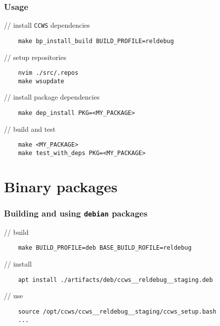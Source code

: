 \documentclass[hyperref={colorlinks=false, breaklinks=true},11pt]{beamer}
\begin{document}
\begin{frame}[fragile]
    \frametitle{Usage}
\begin{block}{// install \texttt{CCWS} dependencies}
\begin{verbatim}
    make bp_install_build BUILD_PROFILE=reldebug
\end{verbatim}
\end{block}

\begin{block}{// setup repositories}
\begin{verbatim}
    nvim ./src/.repos
    make wsupdate
\end{verbatim}
\end{block}

\begin{block}{// install package dependencies}
\begin{verbatim}
    make dep_install PKG=<MY_PACKAGE>
\end{verbatim}
\end{block}

\begin{block}{// build and test}
\begin{verbatim}
    make <MY_PACKAGE>
    make test_with_deps PKG=<MY_PACKAGE>
\end{verbatim}
\end{block}
\end{frame}


\section{Binary packages}

\begin{frame}[fragile]
    \frametitle{Building and using \texttt{debian} packages}
\begin{block}{// build}
\begin{verbatim}
    make BUILD_PROFILE=deb BASE_BUILD_ROFILE=reldebug
\end{verbatim}
\end{block}

\begin{block}{// install}
\begin{verbatim}
    apt install ./artifacts/deb/ccws__reldebug__staging.deb
\end{verbatim}
\end{block}

\begin{block}{// use}
\begin{verbatim}
    source /opt/ccws/ccws__reldebug__staging/ccws_setup.bash
    ...
\end{verbatim}
\end{block}
\end{frame}
\end{document}
